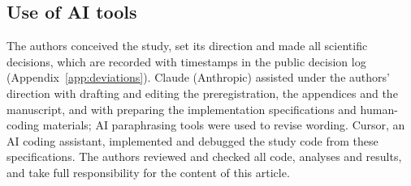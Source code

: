 \subsection{Use of AI tools}
\label{sec:ai-tools}

The authors conceived the study, set its direction and made all scientific decisions, which are recorded with timestamps in the public decision log (Appendix~\ref{app:deviations}). Claude (Anthropic) assisted under the authors' direction with drafting and editing the preregistration, the appendices and the manuscript, and with preparing the implementation specifications and human-coding materials; AI paraphrasing tools were used to revise wording. Cursor, an AI coding assistant, implemented and debugged the study code from these specifications. The authors reviewed and checked all code, analyses and results, and take full responsibility for the content of this article.
